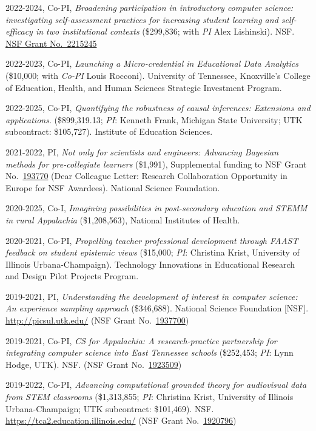 \documentclass[
  14,
]{article}
\begin{document}
2022-2024, Co-PI, \emph{Broadening participation in introductory
computer science: investigating self-assessment practices for increasing
student learning and self-efficacy in two institutional contexts}
(\$299,836; with \emph{PI} Alex Lishinski). NSF.
\href{https://www.nsf.gov/awardsearch/showAward?AWD_ID=2215245\&HistoricalAwards=false}{NSF
Grant No.~2215245}

2022-2023, Co-PI, \emph{Launching a Micro-credential in Educational Data
Analytics} (\$10,000; with \emph{Co-PI} Louis Rocconi). University of
Tennessee, Knoxville's College of Education, Health, and Human Sciences
Strategic Investment Program.

2022-2025, Co-PI, \emph{Quantifying the robustness of causal inferences:
Extensions and applications}. (\$899,319.13; \emph{PI}: Kenneth Frank,
Michigan State University; UTK subcontract: \$105,727). Institute of
Education Sciences.

2021-2022, PI, \emph{Not only for scientists and engineers: Advancing
Bayesian methods for pre-collegiate learners} (\$1,991), Supplemental
funding to NSF Grant
No.~\href{https://www.nsf.gov/awardsearch/showAward?AWD_ID=1937700\&HistoricalAwards=false}{193770}
(Dear Colleague Letter: Research Collaboration Opportunity in Europe for
NSF Awardees). National Science Foundation.

2020-2025, Co-I, \emph{Imagining possibilities in post-secondary
education and STEMM in rural Appalachia} (\$1,208,563), National
Institutes of Health.

2020-2021, Co-PI, \emph{Propelling teacher professional development
through FAAST feedback on student epistemic views} (\$15,000; \emph{PI}:
Christina Krist, University of Illinois Urbana-Champaign). Technology
Innovations in Educational Research and Design Pilot Projects Program.

2019-2021, PI, \emph{Understanding the development of interest in
computer science: An experience sampling approach} (\$346,688). National
Science Foundation {[}NSF{]}. \url{http://picsul.utk.edu/} (NSF Grant
No.~\href{https://www.nsf.gov/awardsearch/showAward?AWD_ID=1937700\&HistoricalAwards=false}{1937700})

2019-2021, Co-PI, \emph{CS for Appalachia: A research-practice
partnership for integrating computer science into East Tennessee
schools} (\$252,453; \emph{PI}: Lynn Hodge, UTK). NSF. (NSF Grant
No.~\href{https://www.nsf.gov/awardsearch/showAward?AWD_ID=1923509\&HistoricalAwards=false}{1923509})

2019-2022, Co-PI, \emph{Advancing computational grounded theory for
audiovisual data from STEM classrooms} (\$1,313,855; \emph{PI}:
Christina Krist, University of Illinois Urbana-Champaign; UTK
subcontract: \$101,469). NSF. \url{https://tca2.education.illinois.edu/}
(NSF Grant
No.~\href{https://www.nsf.gov/awardsearch/showAward?AWD_ID=1920796\&HistoricalAwards=false}{1920796})
\end{document}
